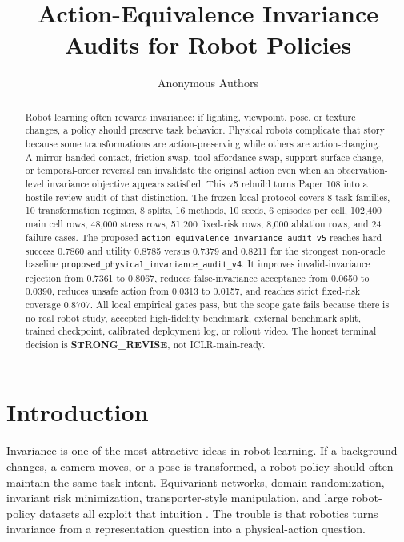 \documentclass{article}
\title{Action-Equivalence Invariance Audits for Robot Policies}
\author{Anonymous Authors}
\begin{document}
\maketitle

\begin{abstract}
Robot learning often rewards invariance: if lighting, viewpoint, pose, or texture changes, a policy should preserve task behavior. Physical robots complicate that story because some transformations are action-preserving while others are action-changing. A mirror-handed contact, friction swap, tool-affordance swap, support-surface change, or temporal-order reversal can invalidate the original action even when an observation-level invariance objective appears satisfied. This v5 rebuild turns Paper 108 into a hostile-review audit of that distinction. The frozen local protocol covers 8 task families, 10 transformation regimes, 8 splits, 16 methods, 10 seeds, 6 episodes per cell, 102,400 main cell rows, 48,000 stress rows, 51,200 fixed-risk rows, 8,000 ablation rows, and 24 failure cases. The proposed \texttt{action\_equivalence\_invariance\_audit\_v5} reaches hard success 0.7860 and utility 0.8785 versus 0.7379 and 0.8211 for the strongest non-oracle baseline \texttt{proposed\_physical\_invariance\_audit\_v4}. It improves invalid-invariance rejection from 0.7361 to 0.8067, reduces false-invariance acceptance from 0.0650 to 0.0390, reduces unsafe action from 0.0313 to 0.0157, and reaches strict fixed-risk coverage 0.8707. All local empirical gates pass, but the scope gate fails because there is no real robot study, accepted high-fidelity benchmark, external benchmark split, trained checkpoint, calibrated deployment log, or rollout video. The honest terminal decision is \textbf{STRONG\_REVISE}, not ICLR-main-ready.
\end{abstract}

\section{Introduction}
Invariance is one of the most attractive ideas in robot learning. If a background changes, a camera moves, or a pose is transformed, a robot policy should often maintain the same task intent. Equivariant networks, domain randomization, invariant risk minimization, transporter-style manipulation, and large robot-policy datasets all exploit that intuition \citep{cohen2016group,tobin2017domain,arjovsky2019invariant,zeng2020transporter,mandlekar2021robomimic}. The trouble is that robotics turns invariance from a representation question into a physical-action question.
\end{document}
